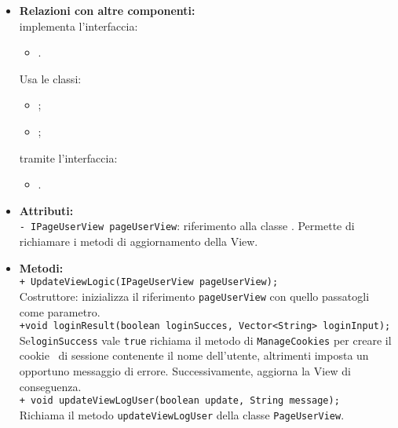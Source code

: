 {{\begin{sloppypar}
{{{\begin{itemize}
				\item[] \textbf{Relazioni con altre componenti:}\\
					implementa l'interfaccia: 
					\begin{itemize}
						\item[] .
					\end{itemize}
					Usa le classi:
					\begin{itemize}
						\item[] ;
						\item[] ;
					\end{itemize}
					tramite l'interfaccia:
					\begin{itemize}
						\item[] .\\
					\end{itemize}
				
				\item[] \textbf{Attributi:}\\
					\texttt{- IPageUserView pageUserView}: riferimento alla classe . Permette di richiamare i metodi di aggiornamento della View.\\
			
				\item[] \textbf{Metodi:}{\\
					\texttt{+ UpdateViewLogic(IPageUserView pageUserView);}\\
					Costruttore: inizializza il riferimento \texttt{pageUserView} con quello passatogli come parametro.\\
		
					\texttt{+void loginResult(boolean loginSucces, Vector<String> loginInput);}\\
					Se\texttt{loginSuccess} vale \texttt{true} richiama il metodo di \texttt{ManageCookies} per creare il cookie\g~ di sessione contenente il nome dell'utente, altrimenti imposta un opportuno messaggio di errore.
					Successivamente, aggiorna la View di conseguenza.\\

					\texttt{+ void updateViewLogUser(boolean update, String message);}\\
					Richiama il metodo \texttt{updateViewLogUser} della classe \texttt{PageUserView}.\\

}
\end{itemize}}}}
\end{sloppypar}}}
